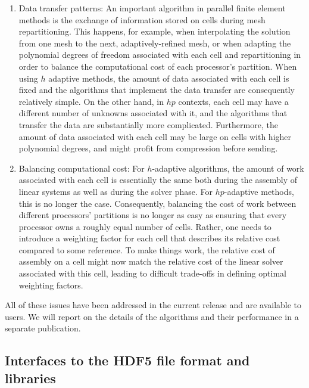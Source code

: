 \documentclass{ansarticle-preprint}
\begin{document}
\begin{enumerate}
\item Data transfer patterns: An important algorithm in parallel
  finite element methods is the exchange of information stored on
  cells during mesh repartitioning. This happens, for example, when
  interpolating the solution from one mesh to the next,
  adaptively-refined mesh, or when adapting the polynomial degrees of
  freedom associated with each cell and repartitioning in order to
  balance the computational cost of each processor's partition. When
  using $h$ adaptive methods, the amount of data associated with each
  cell is fixed and the algorithms that implement the data transfer
  are consequently relatively simple. On the other hand, in $hp$
  contexts, each cell may have a different number of unknowns
  associated with it, and the algorithms that transfer the data are
  substantially more complicated. Furthermore, the amount of data
  associated with each cell may be large on cells with higher
  polynomial degrees, and might profit from compression before
  sending.

\item Balancing computational cost: For $h$-adaptive algorithms, the
  amount of work associated with each cell is essentially the same
  both during the assembly of linear systems as well as during the
  solver phase. For $hp$-adaptive methods, this is no longer the
  case. Consequently, balancing the cost of work between different
  processors' partitions is no longer as easy as ensuring that every
  processor owns a roughly equal number of cells. Rather, one needs to
  introduce a weighting factor for each cell that describes its
  relative cost compared to some reference. To make things work, the
  relative cost of assembly on a cell might now match the relative
  cost of the linear solver associated with this cell, leading to
  difficult trade-offs in defining optimal weighting factors.
\end{enumerate}

All of these issues have been addressed in the current release and are
available to users. We will report on the details of the algorithms
and their performance in a separate publication.


\subsection{Interfaces to the HDF5 file format and libraries}

\end{document}
